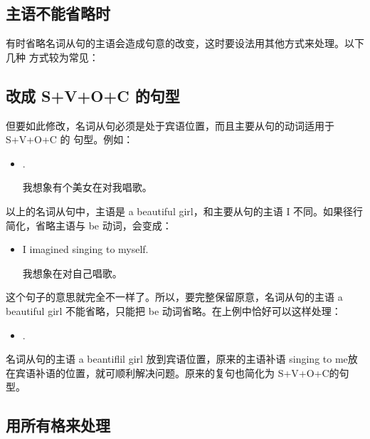 \subsection{主语不能省略时}

有时省略名词从句的主语会造成句意的改变，这时要设法用其他方式来处理。以下几种
方式较为常见：

\subsection{ 改成 S+V+O+C 的句型}

但要如此修改，名词从句必须是处于宾语位置，而且主要从句的动词适用于S+V+O+C 的
句型。例如：
\begin{itemize}
\item {}  .

  我想象有个美女在对我唱歌。
\end{itemize}
以上的名词从句中，主语是 a beautiful girl，和主要从句的主语 I
不同。如果径行简化，省略主语与 be 动词，会变成：
\begin{itemize}
\item   I imagined singing to myself.

  我想象在对自己唱歌。
\end{itemize}
这个句子的意思就完全不一样了。所以，要完整保留原意，名词从句的主语 a
beautiful girl 不能省略，只能把 be 动词省略。在上例中恰好可以这样处理：
\begin{itemize}
\item {}   .
\end{itemize}
名词从句的主语 a beantiflil girl 放到宾语位置，原来的主语补语 singing to me放
在宾语补语的位置，就可顺利解决问题。原来的复句也简化为 S+V+O+C的句型。

\subsection{用所有格来处理}


